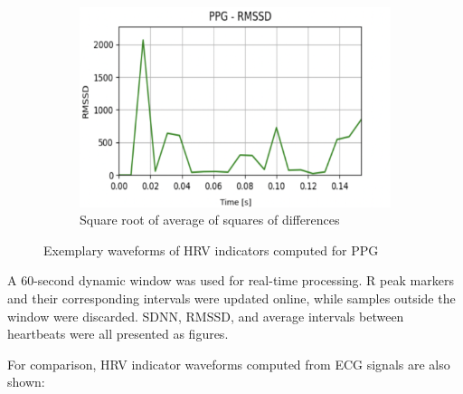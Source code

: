 \documentclass[journal]{IEEEtran}
\begin{document}
\begin{figure}[h]
    \vspace{0.2cm}  
    \begin{subfigure}{0.47\textwidth}
        \centering
        \includegraphics[width=\linewidth]{RMSSD.png}
        \caption{Square root of average of squares of differences}
    \end{subfigure}  
    \caption{Exemplary waveforms of HRV indicators computed for PPG}
\end{figure}

\newpage
A 60-second dynamic window was used for real-time processing. R peak markers and their corresponding intervals were updated online, while samples outside the window were discarded. SDNN, RMSSD, and average intervals between heartbeats were all presented as figures.

For comparison, HRV indicator waveforms computed from ECG signals are also shown:
\end{document}

